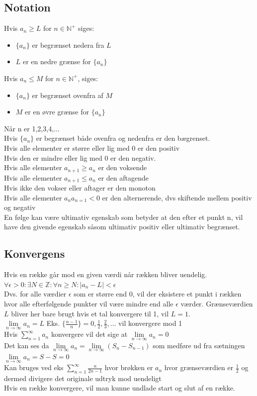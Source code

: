 \documentclass[12pt, a4paper]{article}
\begin{document}
	\subsection{Notation}
		Hvis $a_n \geq L$ for $n\in\mathbb{N}^+$ siges:
		\begin{itemize}
			\item $\{a_n\}$ er begrænset nedera fra $L$
			\item $L$ er en nedre grænse for $\{a_n\}$
		\end{itemize}
		Hvis $a_n \leq M$ for $n\in\mathbb{N}^+$, siges:
		\begin{itemize}
			\item $\{a_n\}$ er begrænset ovenfra af $M$
			\item $M$ er en øvre grænse for $\{a_n\}$
		\end{itemize}
		Når n er 1,2,3,4,...\\
		Hvis $\{a_n\}$ er begrænset både ovenfra og nedenfra er den bægrenset.\\[4mm]
		Hvis alle elementer er større eller lig med 0 er den positiv\\
		Hvis den er mindre eller lig med 0 er den negativ.\\
		Hvis alle elementer $a_{n+1}\geq a_n$ er den voksende\\
		Hvis alle elementer $a_{n+1}\leq a_n$ er den aftagende\\
		Hvis ikke den vokser eller aftager er den monoton\\
		Hvis alle elementer $a_na_{n=1}<0$ er den alternerende, dvs skiftende mellem positiv og negativ\\
		En følge kan være ultimativ egenskab som betyder at den efter et punkt n, vil have den givende egenskab såsom ultimativ positiv eller ultimativ begrænset.
	\subsection{Konvergens}
		Hvis en række går mod en given værdi når rækken bliver uendelig.\\
		$\forall \epsilon > 0: \exists N \in \mathbb{Z}:\forall n \geq N: |a_n-L|<\epsilon$\\
		Dvs. for alle værdier $\epsilon$ som er større end 0, vil der eksistere et punkt i rækken hvor alle efterfølgende punkter vil være mindre end alle $\epsilon$ værder. Grænseværdien $L$ bliver her bare brugt hvis et tal konvergere til 1, vil $L=1$.\\
		$\lim\limits_{n\rightarrow\infty} a_n=L$
		Eks. $\{\frac{n-1}{n}\}=0,\frac{1}{2},\frac{2}{3},...$ vil konvergere mod 1\\[4mm]
		Hvis $\sum\limits_{n=1}^{\infty}a_n$ konvergere vil det sige at $\lim\limits_{n\rightarrow \infty}a_n=0$\\
		Det kan ses da $\lim\limits_{n\rightarrow \infty}a_n=\lim\limits_{n\rightarrow\infty}(S_n-S_{n-1})$ som medføre ud fra sætningen $\lim\limits_{n\rightarrow \infty}a_n=S-S=0$\\
		Kan bruges ved eks $\sum\limits_{n=1}^{\infty}\frac{n}{2n-1}$ hvor brøkken er $a_n$ hvor grænseværdien er $\frac{1}{2}$ og dermed divigere det originale udtryk mod uendeligt\\[4mm]
		Hvis en række konvergere, vil man kunne undlade start og slut af en række.
\end{document}
